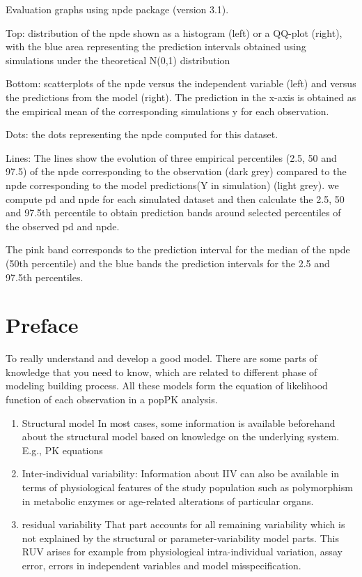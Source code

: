 \documentclass[
]{book}
\begin{document}
Evaluation graphs using npde package (version 3.1).

Top: distribution of the npde shown as a histogram (left) or a QQ-plot (right), with the blue area representing the prediction intervals obtained using simulations under the theoretical N(0,1) distribution

Bottom: scatterplots of the npde versus the independent variable (left) and versus the predictions from the model (right). The prediction in the x-axis is obtained as the empirical mean of the corresponding simulations y for each observation.

Dots: the dots representing the npde computed for this dataset.

Lines: The lines show the evolution of three empirical percentiles (2.5, 50 and 97.5) of the npde corresponding to the observation (dark grey) compared to the npde corresponding to the model predictions(Y in simulation) (light grey). we compute pd and npde for each simulated dataset and then calculate the 2.5, 50 and 97.5th percentile to obtain prediction bands around selected percentiles of the observed pd and npde.

The pink band corresponds to the prediction interval for the median of the npde (50th percentile) and the blue bands the prediction intervals for the 2.5 and 97.5th percentiles.

\hypertarget{preface}{%
\chapter{Preface}\label{preface}}

To really understand and develop a good model. There are some parts of knowledge that you need to know, which are related to different phase of modeling building process. All these models form the equation of likelihood function of each observation in a popPK analysis.

\begin{enumerate}
\def\labelenumi{\arabic{enumi}.}
\item
  Structural model
  In most cases, some information is available beforehand about the structural model based on knowledge on the underlying system. E.g., PK equations
\item
  Inter-individual variability:
  Information about IIV can also be available in terms of physiological features of the study population such as polymorphism in metabolic enzymes or age-related alterations of particular organs.
\item
  residual variability
  That part accounts for all remaining variability which is not explained by the structural or parameter-variability model parts. This RUV arises for example from physiological intra-individual variation, assay error, errors in independent variables and model misspecification.
\end{enumerate}
\end{document}

